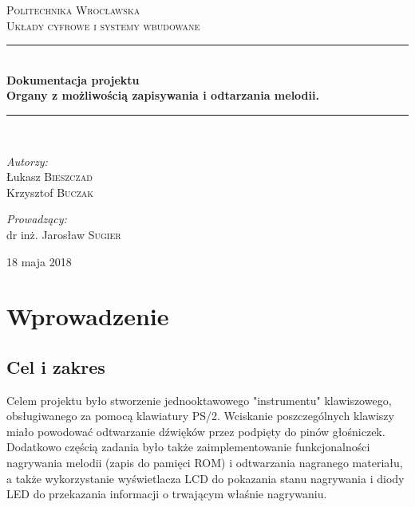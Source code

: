 \documentclass[a4paper,11pt]{article}
\begin{document}
\begin{titlepage}

\newcommand{\HRule}{\rule{\linewidth}{0.5mm}}
\center
 
\textsc{\LARGE Politechnika Wrocławska}\\[1.5cm] 
\textsc{\Large Układy cyfrowe i systemy wbudowane}\\[0.5cm] %

\HRule \\[0.5cm]
{ \huge \bfseries Dokumentacja projektu \\ Organy z możliwością zapisywania i odtarzania melodii.}\\[0.5cm] %
\HRule \\[1.6cm]
 
\begin{flushleft} \large

\emph{Autorzy:}\\
Łukasz  \textsc{Bieszczad}\\ %
Krzysztof  \textsc{Buczak}\\ %

\end{flushleft}

\begin{flushright} \large

\emph{Prowadzący:} \\
dr inż. Jarosław \textsc{Sugier} %

\end{flushright}

\vfill
{\large 18 maja 2018}\\[3cm] %


\end{titlepage}

\section{Wprowadzenie}
\subsection{Cel i zakres}
Celem projektu było stworzenie jednooktawowego "instrumentu" klawiszowego, obsługiwanego za pomocą klawiatury PS/2. Wciskanie poszczególnych klawiszy miało powodować odtwarzanie dźwięków przez podpięty do pinów głośniczek. Dodatkowo częścią zadania było także zaimplementowanie funkcjonalności nagrywania melodii (zapis do pamięci ROM) i odtwarzania nagranego materiału, a także wykorzystanie wyświetlacza LCD do pokazania stanu nagrywania i diody LED do przekazania informacji o trwającym właśnie nagrywaniu.
\end{document}
